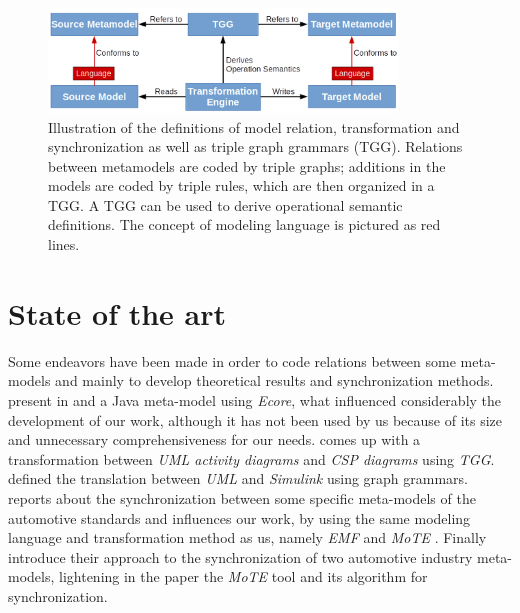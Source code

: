 \documentclass[tuberlin,cic,tc,english,noabntcite]{iiufrgs}
\begin{document}
\begin{description}
	\begin{figure}[h]
	    \caption{Illustration of the definitions of model relation, transformation and synchronization as well as triple graph grammars (TGG). Relations between metamodels are coded by triple graphs; additions in the models are coded by triple rules, which are then organized in a TGG. A TGG can be used to derive operational semantic definitions. The concept of modeling language is pictured as red lines.}
	    \begin{center}
	        \includegraphics[width=25em]{transformation_scheme}
	    \end{center}
	    \label{fig:transformation_scheme}
	\end{figure}
\end{description}

\chapter{State of the art}
Some endeavors have been made in order to code relations between some meta-models and mainly to develop theoretical results and synchronization methods. \citeauthor{heidenreich2010closing} present in \citeyearpar{heidenreich2009jamopp} and \citeyearpar{heidenreich2010closing} a Java meta-model using \emph{Ecore}, what influenced considerably the development of our work, although it has not been used by us because of its size and unnecessary comprehensiveness for our needs. \citet{greenyer2008tggs} comes up with a transformation between \emph{UML activity diagrams} and \emph{CSP diagrams} using \emph{TGG}. \citet{foss2011uml} defined the translation between \emph{UML} and \emph{Simulink} using graph grammars. \citet{blouin2014synchronization} reports about the synchronization between some specific meta-models of the automotive standards and influences our work, by using the same modeling language and transformation method as us, namely \emph{EMF} \citep{steinberg2008emf} and \emph{MoTE} \citep{giese2010toward}. Finally \citet{giese2010model} introduce their approach to the synchronization of two automotive industry meta-models, lightening in the paper the \emph{MoTE} tool and its algorithm for synchronization.
\end{document}
